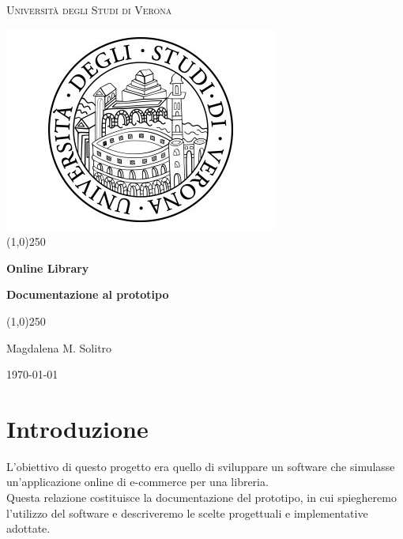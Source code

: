 \documentclass[12pt,a4paper]{article}
\begin{document}
	\begin{titlepage}
		\centering
		\vspace*{\fill}
		{\scshape\LARGE Università degli Studi di Verona \par}
		\vspace{1.5cm}
		\includegraphics[scale=0.5]{images/univr_logo.png}
		\vspace{1.5cm}\\
		\line(1,0){250} \\
		{\huge\bfseries Online Library\par}
		{\Large\bfseries Documentazione al prototipo \par}
		\line(1,0){250} \\
		\vspace{0.5cm}
		{\Large Magdalena M. Solitro\par}
		\vspace{2cm}
		
		\vspace{5cm}
		\vspace*{\fill}
		{}
		{\large \today\par}
	\end{titlepage}
	\newpage
	\tableofcontents
	\newpage
	\section{Introduzione}
	L'obiettivo di questo progetto era quello di sviluppare un software che simulasse un'applicazione online di e-commerce per una libreria.\\Questa relazione costituisce la documentazione del prototipo, in cui spiegheremo l'utilizzo del software e descriveremo le scelte progettuali e implementative adottate.
\end{document}
